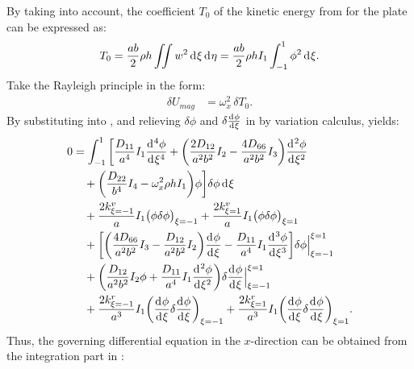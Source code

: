 \documentclass[preprint,12pt]{elsarticle}
\newcommand{\id}{\mathrm{d}\mkern1mu}
\begin{document}
%
By taking  into account, the coefficient \(T_0\) of the kinetic energy from  for the plate can be expressed as:
%
\begin{equation}\label{eq:kine_energyx}
	\begin{split}
		T_0 = \frac{ab}{2}\rho h\iint w^2 \, \id \xi \, \id \eta = \frac{ab}{2}\rho h I_1\int_{-1}^{1} \phi^2 \, \id \xi.
	\end{split}
\end{equation}
%
Take the Rayleigh principle in the form:
%
\begin{equation}\label{eq:Rayleighx}
	\begin{split}
		\delta U_{mag} &= \omega_x^2 \, \delta T_0.
	\end{split}
\end{equation}
%
By substituting  into , and relieving \(\delta \phi\) and \(\delta\frac{\id  \phi}{\id \xi}\) in  by variation calculus, yields:
%
\begin{equation}\label{eq:Rayleighx2}
	\begin{split}
		0 &= \int_{-1}^{1} \bigg[ \frac{D_{11}}{a^4} I_1 \frac{\id^4 \phi}{\id \xi^4} 
		+ \bigg( \frac{2D_{12}}{a^2b^2} I_2 - \frac{4D_{66}}{a^2b^2} I_3 \bigg) \frac{\id^2 \phi}{\id \xi^2} \\
		&\quad + \bigg( \frac{D_{22}}{b^4} I_4 - \omega_x^2 \rho h I_1 \bigg) \phi \bigg] \delta \phi \, \id \xi \\
		&\quad + \frac{2k^v_{\xi=-1}}{a} I_1 \big(\phi \delta \phi\big)_{\xi=-1} 
		+ \frac{2k^v_{\xi=1}}{a} I_1 \big(\phi \delta \phi\big)_{\xi=1} \\
		&\quad + \bigg[ \bigg( \frac{4D_{66}}{a^2b^2} I_3 - \frac{D_{12}}{a^2b^2} I_2 \bigg) \frac{\id \phi}{\id \xi} 
		- \frac{D_{11}}{a^4} I_1 \frac{\id^3 \phi}{\id \xi^3} \bigg] \delta \phi \Big|^{\xi=1}_{\xi=-1} \\
		&\quad + \bigg( \frac{D_{12}}{a^2b^2} I_2 \phi + \frac{D_{11}}{a^4} I_1 \frac{\id^2 \phi}{\id \xi^2} \bigg) 
		\delta\frac{\id  \phi}{\id \xi} \Big|^{\xi=1}_{\xi=-1} \\
		&\quad + \frac{2k^r_{\xi=-1}}{a^3} I_1 \bigg(\frac{\id \phi}{\id \xi}\delta \frac{\id \phi}{\id \xi}\bigg)_{\xi=-1} 
		+ \frac{2k^r_{\xi=1}}{a^3} I_1 \bigg(\frac{\id \phi}{\id \xi} \delta\frac{\id \phi}{\id \xi}\bigg)_{\xi=1}.
	\end{split}
\end{equation}
%
Thus, the governing differential equation in the \( x \)-direction can be obtained from the integration part in :
\end{document}
